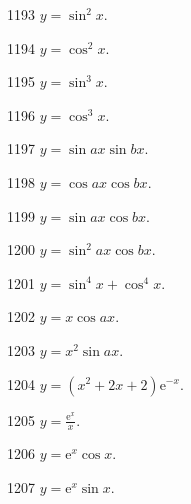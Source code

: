 \begin{prob}[S]{1193}
$y = \sin^2 x$.
\end{prob}

\begin{prob}[S]{1194}
$y = \cos^2 x$.
\end{prob}

\begin{prob}[S]{1195}
$y = \sin^3 x$.
\end{prob}

\begin{prob}[S]{1196}
$y = \cos^3 x$.
\end{prob}

\begin{prob}[S]{1197}
$y = \sin ax\sin bx$.
\end{prob}

\begin{prob}[S]{1198}
$y = \cos ax\cos bx$.
\end{prob}

\begin{prob}[S]{1199}
$y = \sin ax\cos bx$.
\end{prob}

\begin{prob}[S]{1200}
$y = \sin^2 ax\cos bx$.
\end{prob}

\begin{prob}[S]{1201}
$y = \sin^4 x + \cos^4 x$.
\end{prob}

\begin{prob}[S]{1202}
$y = x\cos ax$.
\end{prob}

\begin{prob}[S]{1203}
$y = x^2\sin ax$.
\end{prob}

\begin{prob}[S]{1204}
$y = (x^2 + 2x + 2)\mathrm{e}^{-x}$.
\end{prob}

\begin{prob}[S]{1205}
$y = \frac{\mathrm{e}^x}{x}$.
\end{prob}

\begin{prob}[S]{1206}
$y = \mathrm{e}^x\cos x$.
\end{prob}

\begin{prob}[S]{1207}
$y = \mathrm{e}^x\sin x$.
\end{prob}

